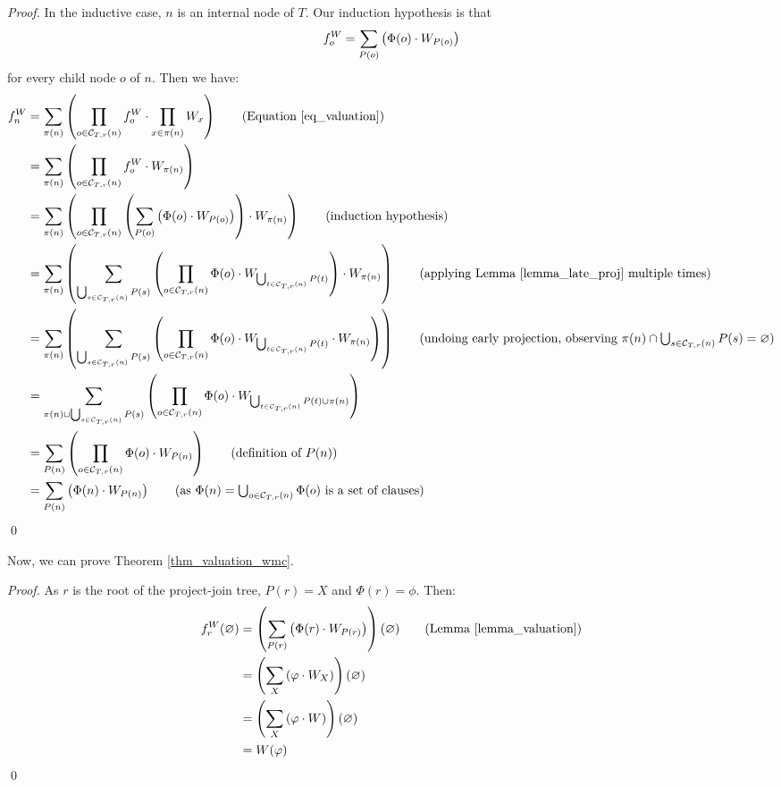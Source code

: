 \begin{proof}
    In the inductive case, $n$ is an internal node of $T$.
    Our induction hypothesis is that
    $$f^W_o = \sum_{P(o)} \left(  \Phi(o) \cdot W_{P(o)}  \right)$$
    for every child node $o$ of $n$.
    Then we have:
    \begin{align*}
        f^W_n
        & = \proj_{\pi(n)} \pars{\prod_{o \in \C{T}{r}{n}} f^W_o \mult \prod_{x \in \pi(n)} W_x} \tag{Equation \eqref{eq_valuation}} \\
        & = \proj_{\pi(n)} \pars{\prod_{o \in \C{T}{r}{n}} f^W_o \mult W_{\pi(n)}} \\
        & = \proj_{\pi(n)} \pars{\prod_{o \in \C{T}{r}{n}} \pars{\proj_{P(o)} \pars{ \Phi(o) \mult W_{P(o)} } } \mult W_{\pi(n)}} \tag{induction hypothesis} \\
        & = \proj_{\pi(n)} \pars{ \proj_{\bigcup_{s \in \C{T}{r}{n}} P(s)} \pars{ \prod_{o \in \C{T}{r}{n}} \Phi(o) \mult W_{\bigcup_{t \in \C{T}{r}{n}} P(t)} } \mult W_{\pi(n)} } \tag{applying Lemma \ref{lemma_late_proj} multiple times} \\
        & = \proj_{\pi(n)} \pars{ \proj_{\bigcup_{s \in \C{T}{r}{n}} P(s)} \pars{ \prod_{o \in \C{T}{r}{n}} \Phi(o) \mult W_{\bigcup_{t \in \C{T}{r}{n}} P(t)} \mult W_{\pi(n)}} } \tag{undoing early projection, observing $\pi(n) \cap \bigcup_{s \in \C{T}{r}{n}} P(s) = \emptyset$} \\
        & = \proj_{\pi(n) \cup \bigcup_{s \in \C{T}{r}{n}} P(s)} \pars{ \prod_{o \in \C{T}{r}{n}} \Phi(o) \mult W_{\bigcup_{t \in \C{T}{r}{n}} P(t) \cup \pi(n)} } \\
        & = \proj_{P(n)} \pars{ \prod_{o \in \C{T}{r}{n}} \Phi(o) \mult W_{P(n)} } \tag{definition of $P(n)$} \\
        & = \proj_{P(n)} \pars{ \Phi(n) \mult W_{P(n)} } \tag{as $\Phi(n) = \bigcup_{o \in \C{T}{r}{n}} \Phi(o)$ is a set of clauses}
    \end{align*}
\qed
\end{proof}

Now, we can prove Theorem \ref{thm_valuation_wmc}.
\begin{proof}
    As $r$ is the root of the project-join tree, $P(r) = X$ and $\Phi(r) = \phi$.
    Then:
    \begin{align*}
        f^W_r(\emptyset)
        & = \pars{ \proj_{P(r)} \pars{ \Phi(r) \mult W_{P(r)} } } (\emptyset) \tag{Lemma \ref{lemma_valuation}} \\
        & = \pars{ \proj_{X} \pars{ \phi \mult W_{X} } } (\emptyset) \\
        & = \pars{ \proj_{X} \pars{ \phi \mult W } } (\emptyset) \\
        & = W(\phi)
    \end{align*}
\qed
\end{proof}

